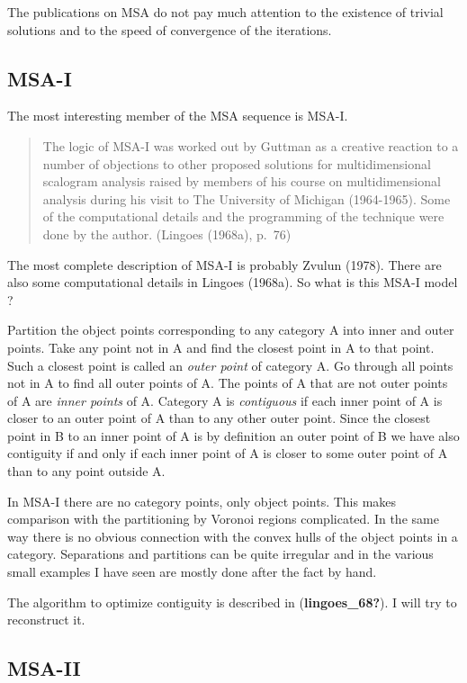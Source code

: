 \documentclass[
  12pt,
]{article}
\begin{document}
The publications on MSA do not pay much attention to the existence
of trivial solutions and to the speed of convergence of the
iterations.

\subsection{MSA-I}\label{msa-i}

The most interesting member of the MSA sequence is MSA-I.

\begin{quote}
The logic of MSA-I was worked out by Guttman as a creative reaction to a number of objections to other proposed solutions for multidimensional scalogram analysis raised by members of his course on multidimensional analysis during his visit to The University of Michigan (1964-1965).
Some of the computational details and the programming of the technique were done by the author. (Lingoes (1968a), p.~76)
\end{quote}

The most complete description of MSA-I is probably Zvulun (1978). There
are also some computational details in Lingoes (1968a). So what is this
MSA-I model ?

Partition the object points corresponding to any category A into inner and outer points. Take any point not in A and find the closest point in A to that point. Such a closest point is called an \emph{outer point} of category A. Go through all points not in A to find all outer points of A. The points of A that are not outer points of A are \emph{inner points} of A.
Category A is \emph{contiguous} if each inner point of A is closer to an outer point of A than to any other outer point. Since the closest point in B to an inner point of A is by definition an outer point of B we have also contiguity if and only if each inner point of A is closer to some outer point of A than to any point outside A.

In MSA-I there are no category points, only object points. This makes
comparison with the partitioning by Voronoi regions complicated. In
the same way there is no obvious connection with the convex hulls of
the object points in a category. Separations and partitions can be quite
irregular and in the various small examples I have seen are mostly
done after the fact by hand.

The algorithm to optimize contiguity is described in (\textbf{lingoes\_68?}). I will
try to reconstruct it.

\subsection{MSA-II}\label{msa-ii}
\end{document}
